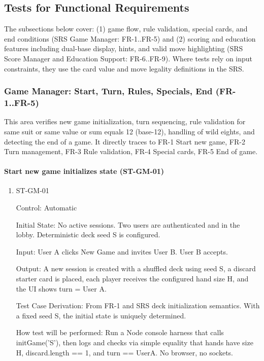 \documentclass[12pt, titlepage]{article}
\begin{document}
\subsection{Tests for Functional Requirements}

The subsections below cover: (1) game flow, rule validation, special cards, and end conditions (SRS Game Manager: FR-1..FR-5) and (2) scoring and education features including dual-base display, hints, and valid move highlighting (SRS Score Manager and Education Support: FR-6..FR-9). Where tests rely on input constraints, they use the card value and move legality definitions in the SRS.

\subsubsection{Game Manager: Start, Turn, Rules, Specials, End (FR-1..FR-5)}

This area verifies new game initialization, turn sequencing, rule validation for same suit or same value or sum equals 12 (base-12), handling of wild eights, and detecting the end of a game. It directly traces to FR-1 Start new game, FR-2 Turn management, FR-3 Rule validation, FR-4 Special cards, FR-5 End of game.

\paragraph{Start new game initializes state (ST-GM-01)}

\begin{enumerate}
\item{ST-GM-01\\}

Control: Automatic
					
Initial State: No active sessions. Two users are authenticated and in the lobby. Deterministic deck seed S is configured.
					
Input: User A clicks New Game and invites User B. User B accepts.					
					
Output: A new session is created with a shuffled deck using seed S, a discard starter card is placed, each player receives the configured hand size H, and the UI shows turn = User A.

Test Case Derivation: From FR-1 and SRS deck initialization semantics. With a fixed seed S, the initial state is uniquely determined.

How test will be performed: Run a Node console harness that calls initGame('S'), then logs and checks via simple equality that hands have size H, discard.length == 1, and turn == UserA. No browser, no sockets.
\end{enumerate}
\end{document}
